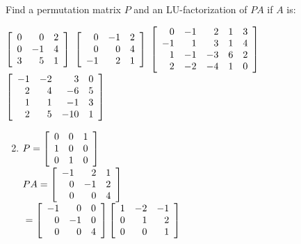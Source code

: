 \begin{multicols}{2}
\columnbreak
\begin{ex}
Find a permutation matrix $P$ and an LU-factorization of $PA$ if $A$ is:
\begin{exenumerate}
\exitem $\left[ \begin{array}{rrr}
0 & 0 & 2 \\
0 & -1 & 4 \\
3 & 5 & 1
\end{array} \right]$
\exitem $\left[ \begin{array}{rrr}
0 & -1 & 2 \\
0 & 0 & 4 \\
-1 & 2 & 1
\end{array} \right]$
\exitem* $\left[ \begin{array}{rrrrr}
0 & -1 & 2 & 1 & 3\\
-1 & 1 & 3 & 1 & 4 \\
1 & -1 & -3 & 6 & 2 \\
2 & -2 & -4 & 1 & 0
\end{array} \right]$
\exitem* $\left[ \begin{array}{rrrr}
-1 & -2 & 3 & 0 \\
2 & 4 & -6 & 5 \\
1 & 1 & -1 & 3 \\
2 & 5 & -10 & 1
\end{array} \right]$
\end{exenumerate}
\begin{sol} 
\begin{enumerate}[label={\alph*.}]
\setcounter{enumi}{1}
\item $P = \left[ \begin{array}{rrr}
0 & 0 & 1 \\
1 & 0 & 0 \\
0 & 1 & 0
\end{array} \right]$ \\ $PA = \left[ \begin{array}{rrr}
-1 & 2 & 1 \\
0 & -1 & 2 \\
0 & 0 & 4
\end{array} \right]$ \\ ${} = \left[ \begin{array}{rrr}
-1 & 0 & 0 \\
0 & -1 & 0 \\
0 & 0 & 4
\end{array} \right] \left[ \begin{array}{rrr}
1 & -2 & -1 \\
0 & 1 & 2 \\
0 & 0 & 1
\end{array} \right]$


\end{enumerate}
\end{sol}
\end{ex}
\end{multicols}

